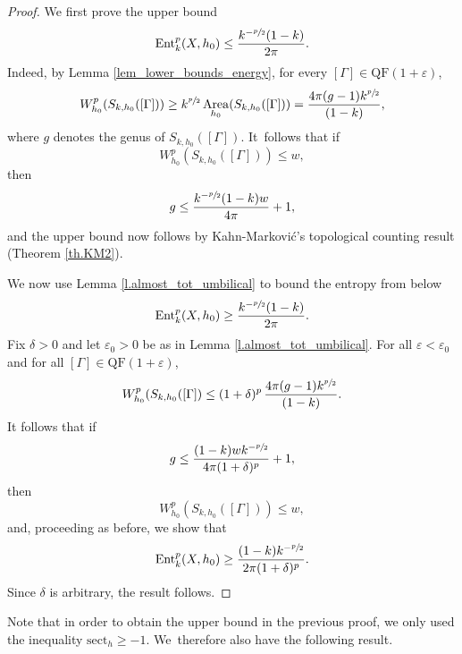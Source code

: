 \documentclass[10pt]{amsart}
\theoremstyle{plain}
\theoremstyle{definition}
\let\eps\varepsilon
\newcommand{\sect}{\mathrm{sect}}
\newcommand{\Ent}{\mathrm{Ent}}
\newcommand{\QF}{\mathrm{QF}}
\DeclareMathOperator{\Area}{Area}
\begin{document}
\begin{proof}
We first prove the upper bound
\begin{equation*}
\Ent^p_{k}(X,h_0)\leq\frac{k^{-\sfrac{p}{2}}(1-k)}{2\pi}.
\end{equation*}
Indeed, by Lemma \ref{lem_lower_bounds_energy}, for every $[\Gamma]\in\QF(1+\eps)$,
\begin{equation*}
W_{h_0}^{p}(S_{k,h_0}([\Gamma]))\geq k^{\sfrac{p}{2}}\Area_{h_0}(S_{k,h_0}([\Gamma]))=\frac{4\pi(g-1)k^{\sfrac{p}{2}}}{(1-k)},
\end{equation*}
where $g$ denotes the genus of $S_{k,h_0}([\Gamma])$. It~follows that if
\begin{equation*}
W_{h_0}^{p}(S_{k,h_0}([\Gamma])) \leq w,
\end{equation*}
then
\begin{equation*}
g \leq \frac{k^{-\sfrac{p}{2}}(1-k)w}{4\pi} + 1,
\end{equation*}
and the upper bound now follows by Kahn-Markovi\'c's topological counting result (Theorem \ref{th.KM2}).

We now use Lemma \ref{l.almost_tot_umbilical} to bound the entropy from below
\begin{equation*}
\Ent^p_{k}(X,h_0)\geq\frac{k^{-\sfrac{p}{2}}(1-k)}{2\pi}.
\end{equation*}
Fix $\delta>0$ and let $\eps_0>0$ be as in Lemma \ref{l.almost_tot_umbilical}. For all $\eps<\eps_0$ and for all $[\Gamma]\in\QF(1+\eps)$,
\begin{equation*}
W^{p}_{h_0}(S_{k,h_0}([\Gamma])\leq (1+\delta)^p\,\frac{4\pi(g-1)k^{\sfrac{p}{2}}}{(1-k)}.
\end{equation*}
It follows that if
\begin{equation*}
g \leq \frac{(1-k)w k^{-\sfrac{p}{2}}}{4\pi(1+\delta)^p} + 1,
\end{equation*}
then
\begin{equation*}
W_{h_0}^{p}(S_{k,h_0}([\Gamma])) \leq w,
\end{equation*}
and, proceeding as before, we show that
\begin{equation*}
\Ent^{p}_{k}(X,h_0)\geq\frac{(1-k)k^{-\sfrac{p}{2}}}{2\pi(1+\delta)^p}.
\end{equation*}
Since $\delta$ is arbitrary, the result follows.
\end{proof}

Note that in order to obtain the upper bound in the previous proof, we only used the inequality $\sect_h\geq -1$. We~therefore also have the following result.
\end{document}
